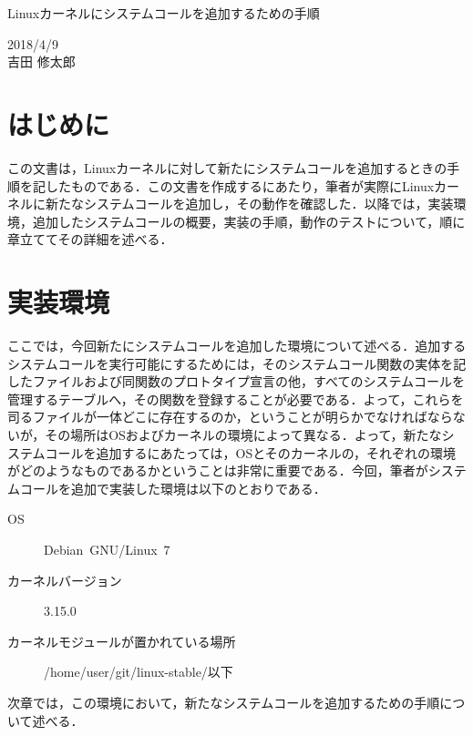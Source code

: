 \documentclass[12pt]{jsarticle}
\begin{document}
\begin{center}
{\LARGE Linuxカーネルにシステムコールを追加するための手順}
\end{center}

\begin{flushright}
  2018/4/9\\
  吉田 修太郎
\end{flushright}
\section{はじめに}
\label{sec:introduction}
この文書は，Linuxカーネルに対して新たにシステムコールを追加するときの手順を記したものである．この文書を作成するにあたり，筆者が実際にLinuxカーネルに新たなシステムコールを追加し，その動作を確認した．以降では，実装環境，追加したシステムコールの概要，実装の手順，動作のテストについて，順に章立ててその詳細を述べる．
\section{実装環境}
ここでは，今回新たにシステムコールを追加した環境について述べる．追加するシステムコールを実行可能にするためには，そのシステムコール関数の実体を記したファイルおよび同関数のプロトタイプ宣言の他，すべてのシステムコールを管理するテーブルへ，その関数を登録することが必要である．よって，これらを司るファイルが一体どこに存在するのか，ということが明らかでなければならないが，その場所はOSおよびカーネルの環境によって異なる．よって，新たなシステムコールを追加するにあたっては，OSとそのカーネルの，それぞれの環境がどのようなものであるかということは非常に重要である．今回，筆者がシステムコールを追加で実装した環境は以下のとおりである．
\begin{description}
\item[OS] Debian\ GNU\slash{}Linux\ 7
\item[カーネルバージョン] 3.15.0
\item[カーネルモジュールが置かれている場所] \slash{}home\slash{}user\slash{}git\slash{}linux-stable\slash{}以下
\end{description}
次章では，この環境において，新たなシステムコールを追加するための手順について述べる．
\end{document}
